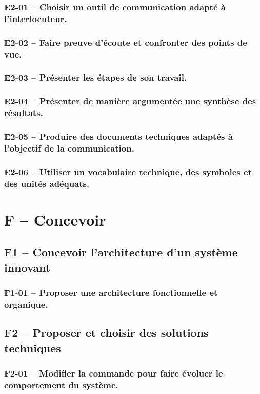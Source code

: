 \subsubsection*{E2-01 -- Choisir un outil de communication adapté à l’interlocuteur.}  
\subsubsection*{E2-02 -- Faire preuve d’écoute et confronter des points de vue.}  
\subsubsection*{E2-03 -- Présenter les étapes de son travail.}  
\subsubsection*{E2-04 -- Présenter de manière argumentée une synthèse des résultats.}  
\subsubsection*{E2-05 -- Produire des documents techniques adaptés à l'objectif de la communication. }  
\subsubsection*{E2-06 -- Utiliser un vocabulaire technique, des symboles et des unités adéquats.}  
\section{F -- Concevoir}  
\subsection{F1 -- Concevoir l'architecture d'un système innovant}  
\subsubsection*{F1-01 -- Proposer une architecture fonctionnelle et organique.}  
\subsection{F2 -- Proposer et choisir des solutions techniques}  
\subsubsection*{F2-01 -- Modifier la commande pour faire évoluer le comportement du système. }  
